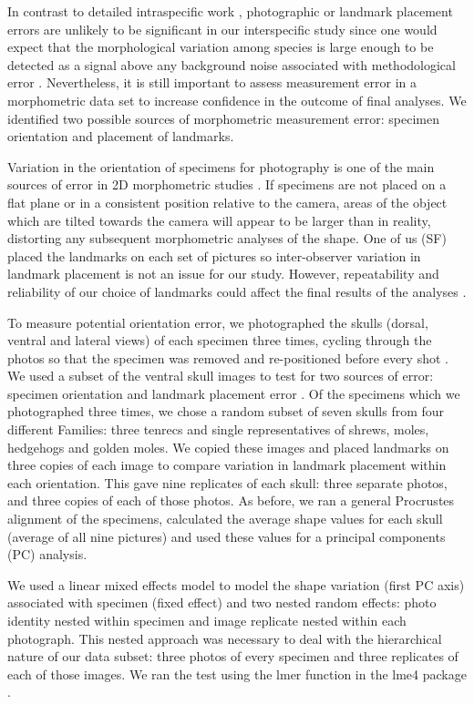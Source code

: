 \documentclass[12pt,a4paper]{article}
\begin{document}
	In contrast to detailed intraspecific work \citep[e.g.][]{Bornholdt2008, Blagojevic2011}, photographic or landmark placement errors are unlikely to be significant in our interspecific study since one would expect that the morphological variation among species is large enough to  be detected as a signal above any background noise associated with methodological error \citep{Arnqvist1998}. Nevertheless, it is still important to assess measurement error in a morphometric data set to increase confidence in the outcome of final analyses.
	We identified two possible sources of morphometric measurement error: specimen orientation and placement of landmarks.

	Variation in the orientation of specimens for photography is one of the main sources of error in 2D morphometric studies \citep{Adriaens2007}. If specimens are not placed on a flat plane or in a consistent position relative to the camera, areas of the object which are tilted towards the camera will appear to be larger than in reality, distorting any subsequent morphometric analyses of the shape. 
	One of us (SF) placed the landmarks on each set of pictures so inter-observer variation in landmark placement is not an issue for our study.  However, repeatability and reliability of our choice of landmarks could affect the final results of the analyses \citep{Arnqvist1998}.


	To measure potential orientation error, we photographed the skulls (dorsal, ventral and lateral views) of each specimen three times, cycling through the photos so that the specimen was removed and re-positioned before every shot \citep{Viscosi2011}.
	We used a subset of the ventral skull images to test for two sources of error: specimen orientation and landmark placement error \citep{Arnqvist1998, Barrow2008}. Of the specimens which we photographed three times, we chose a random subset of seven skulls from four different Families: three tenrecs and single representatives of shrews, moles, hedgehogs and golden moles. We copied these images and placed landmarks on three copies of each image to compare variation in landmark placement within each orientation. This gave nine replicates of each skull: three separate photos, and three copies of each of those photos. As before, we ran a general Procrustes alignment \citep{Rohlf1993} of the specimens, calculated the average shape values for each skull (average of all nine pictures) and used these values for a principal components (PC) analysis. 
		
	We used a linear mixed effects model to model the shape variation (first PC axis) associated with specimen (fixed effect) and two nested random effects: photo identity nested within specimen and image replicate nested within each photograph. This nested approach was necessary to deal with the hierarchical nature of our data subset: three photos of every specimen and three replicates of each of those images. We ran the test using the lmer function in the lme4 package \citep{Bates2014}.  
\end{document}

